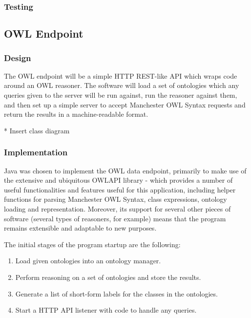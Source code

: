 \documentclass{article}
\begin{document}
\subsubsection{Testing}

\subsection{OWL Endpoint}

\subsubsection{Design}

The OWL endpoint will be a simple HTTP REST-like API which wraps code around an
OWL reasoner. The software will load a set of ontologies which any queries given
to the server will be run against, run the reasoner against them, and then set
up a simple server to accept Manchester OWL Syntax requests and return the
results in a machine-readable format.

* Insert class diagram

\subsubsection{Implementation}

Java was chosen to implement the OWL data endpoint, primarily to make use of the
extensive and ubiquitous OWLAPI library - which provides a number of useful
functionalities and features useful for this application, including helper
functions for parsing Manchester OWL Syntax, class expressions, ontology loading
and representation. Moreover, its support for several other pieces of software
(several types of reasoners, for example) means that the program remains
extensible and adaptable to new purposes.

The initial stages of the program startup are the following:

\begin{enumerate}
    \item Load given ontologies into an ontology manager. 
    \item Perform reasoning on a set of ontologies and store the results.
    \item Generate a list of short-form labels for the classes in the
    ontologies.
    \item Start a HTTP API listener with code to handle any queries.
\end{enumerate}
\end{document}
